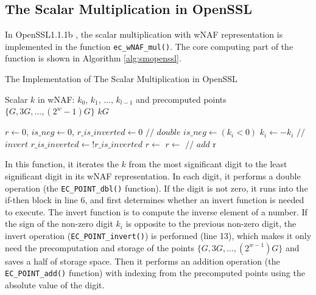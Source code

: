 %
\subsection{The Scalar Multiplication in OpenSSL}
\label{intro_smulinssl}
In OpenSSL1.1.1b \cite{openssl}, the scalar multiplication with wNAF representation is implemented in the function \verb+ec_wNAF_mul()+.
The core computing part of the function is shown in Algorithm  \ref{alg:smopenssl}.

\renewcommand{\algorithmicrequire}{\textbf{Input:}}
\renewcommand{\algorithmicensure}{\textbf{Output:}}

\begin{algorithm}[t]
        \caption{The Implementation of The Scalar Multiplication in OpenSSL}
        \label{alg:smopenssl}
        \begin{algorithmic}[1]
            \Require Scalar $k$ in wNAF: $k_0$, $k_1$, ..., $k_{l-1}$ and precomputed points $\{G, 3G, ..., (2^{w} - 1)G\}$
            \Ensure $kG$
			
			\State $r \gets 0$, $is\_neg \gets 0$, $r\_is\_inverted \gets 0$
            		\State {}     {   }  $//$ $double$
                \EndIf
                	\State $is\_neg \gets (k_i < 0)$
                		\State $k_i \gets -k_i$
                	\EndIf
                			\State {}   {   }  $//$ $invert$
                		\EndIf                	
                    	\State $r\_is\_inverted \gets !r\_is\_inverted$
                	\EndIf
                		\State $r \gets $ 
                	\Else
                		\State $r \gets $  {   }  $//$   $add$
                	\EndIf
                \EndIf
            \EndFor
            \State \Return r
        \end{algorithmic}
\end{algorithm}

In this function, it iterates the $k$ from the most significant digit to the least significant digit in its wNAF representation.
 In each digit, it performs a double operation (the \verb+EC_POINT_dbl()+ function).
  If the digit is not zero, it runs into the if-then block in line 6, and first determines whether an invert function is needed to execute.
   The invert function is to compute the inverse element of a number. 
If the sign of the non-zero digit $k_i$ is opposite to the previous  non-zero digit,
 the invert operation (\verb+EC_POINT_invert()+) is performed (line 13),
which makes it only need the precomputation and storage of the points $\{G, 3G, ..., (2^{w - 1})G\}$ and saves a half of storage space.
Then it performs an addition operation (the \verb+EC_POINT_add()+ function) with  indexing from the precomputed points using the
absolute value of the digit.


